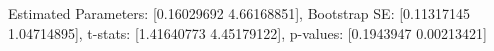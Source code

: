 Estimated Parameters: [0.16029692 4.66168851], Bootstrap SE: [0.11317145 1.04714895], t-stats: [1.41640773 4.45179122], p-values: [0.1943947  0.00213421]